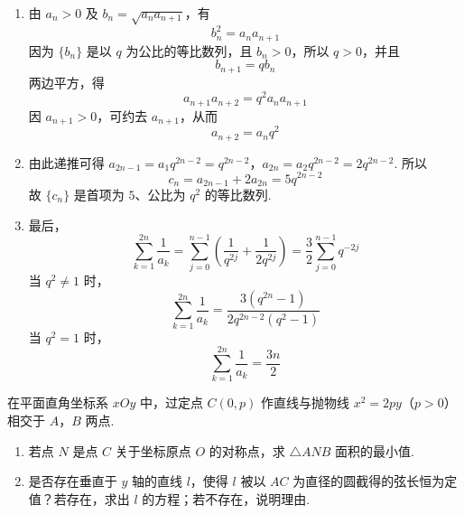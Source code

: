\begin{solution}
\begin{enumerate}
\item
由 \(a_n>0\) 及 \(b_n=\sqrt{a_na_{n+1}}\)，有
\[
b_n^2=a_na_{n+1}
\]
因为 \(\{b_n\}\) 是以 \(q\) 为公比的等比数列，且 \(b_n>0\)，所以 \(q>0\)，并且
\[
b_{n+1}=qb_n
\]
两边平方，得
\[
a_{n+1}a_{n+2}=q^2a_na_{n+1}
\]
因 \(a_{n+1}>0\)，可约去 \(a_{n+1}\)，从而
\[
a_{n+2}=a_nq^2
\]
\item
由此递推可得
\(a_{2n-1}=a_1q^{2n-2}=q^{2n-2}\)，\(a_{2n}=a_2q^{2n-2}=2q^{2n-2}\).
所以
\[
c_n=a_{2n-1}+2a_{2n}=5q^{2n-2}
\]
故 \(\{c_n\}\) 是首项为 \(5\)、公比为 \(q^2\) 的等比数列.
\item
最后，
\[
\sum_{k=1}^{2n}\frac1{a_k}
=\sum_{j=0}^{n-1}\left(\frac1{q^{2j}}+\frac1{2q^{2j}}\right)
=\frac32\sum_{j=0}^{n-1}q^{-2j}
\]
当 \(q^2\ne1\) 时，
\[
\sum_{k=1}^{2n}\frac1{a_k}
=\frac{3(q^{2n}-1)}{2q^{2n-2}(q^2-1)}
\]
当 \(q^2=1\) 时，
\[
\sum_{k=1}^{2n}\frac1{a_k}=\frac{3n}{2}
\]
\end{enumerate}
\end{solution}

\begin{problem}
在平面直角坐标系 \(xOy\) 中，过定点 \(C(0, p)\) 作直线与抛物线 \(x^{2} = 2py\)（\(p > 0\)）相交于 \(A\)，\(B\) 两点.

\begin{enumerate}
\item 若点 \(N\) 是点 \(C\) 关于坐标原点 \(O\) 的对称点，求 \(\triangle ANB\) 面积的最小值.
\item 是否存在垂直于 \(y\) 轴的直线 \(l\)，使得 \(l\) 被以 \(AC\) 为直径的圆截得的弦长恒为定值？若存在，求出 \(l\) 的方程；若不存在，说明理由.
\end{enumerate}

\end{problem}

